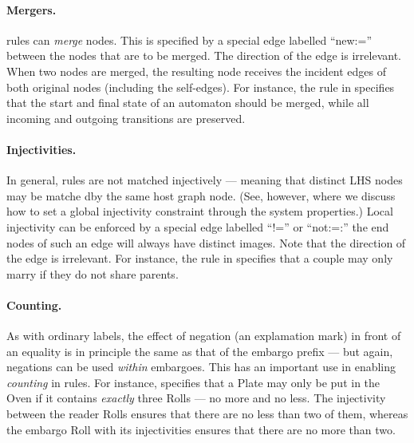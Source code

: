 \paragraph{Mergers.}

\Groove{} rules can \emph{merge} nodes. This is specified by a special edge
labelled ``\textsf{new:=}'' between the nodes that are to be merged. The
direction of the edge is irrelevant. When two nodes are merged, the resulting
node receives the incident edges of both original nodes (including the
self-edges). For instance, the rule in  specifies that the start
and final state of an automaton should be merged, while all incoming and
outgoing transitions are preserved.


\paragraph{Injectivities.}

In general, rules are not matched injectively --- meaning that distinct LHS
nodes may be matche dby the same host graph node. (See, however,
 where we discuss how to set a global injectivity
constraint through the system properties.) Local injectivity can be enforced by
a special edge labelled ``\textsf{!=}'' or ``\textsf{not:=}:'' the end nodes of
such an edge will always have distinct images. Note that the direction of the
edge is irrelevant. For instance, the rule in  specifies that
a couple may only marry if they do not share parents.


\paragraph{Counting.}

As with ordinary labels, the effect of negation (an explamation mark) in front
of an equality is in principle the same as
that of the embargo prefix --- but again, negations can be used \emph{within}
embargoes. This has an important use in enabling \emph{counting} in rules. For
instance,  specifies that a \textsf{Plate} may only be put in
the \textsf{Oven} if it contains \emph{exactly} three \textsf{Roll}s --- no
more and no less. The injectivity between the reader \textsf{Roll}s ensures
that there are no less than two of them, whereas the embargo \textsf{Roll} with
its injectivities ensures that there are no more than two.

